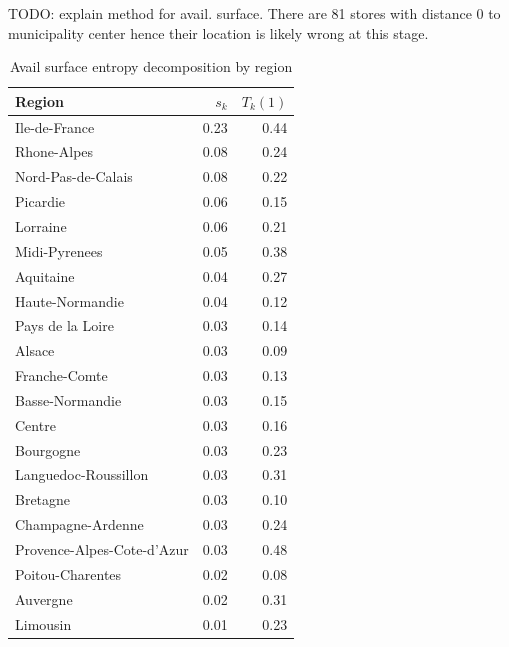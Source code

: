 \documentclass[11pt]{article}
\begin{document}
TODO: explain method for avail. surface. There are 81 stores with distance 0 to municipality center hence their location is likely wrong at this stage.

\begin{table}[H]
\caption{Avail surface entropy decomposition by region}
\footnotesize

\begin{tabular}{lrr}
\toprule
\toprule
Region &        $s_k$ &      $T_k(1)$ \\
\midrule
Ile-de-France              &       0.23 &       0.44 \\
Rhone-Alpes                &       0.08 &       0.24 \\
Nord-Pas-de-Calais         &       0.08 &       0.22 \\
Picardie                   &       0.06 &       0.15 \\
Lorraine                   &       0.06 &       0.21 \\
Midi-Pyrenees              &       0.05 &       0.38 \\
Aquitaine                  &       0.04 &       0.27 \\
Haute-Normandie            &       0.04 &       0.12 \\
Pays de la Loire           &       0.03 &       0.14 \\
Alsace                     &       0.03 &       0.09 \\
Franche-Comte              &       0.03 &       0.13 \\
Basse-Normandie            &       0.03 &       0.15 \\
Centre                     &       0.03 &       0.16 \\
Bourgogne                  &       0.03 &       0.23 \\
Languedoc-Roussillon       &       0.03 &       0.31 \\
Bretagne                   &       0.03 &       0.10 \\
Champagne-Ardenne          &       0.03 &       0.24 \\
Provence-Alpes-Cote-d'Azur &       0.03 &       0.48 \\
Poitou-Charentes           &       0.02 &       0.08 \\
Auvergne                   &       0.02 &       0.31 \\
Limousin                   &       0.01 &       0.23 \\
\bottomrule
\end{tabular}

\end{table}
\end{document}
